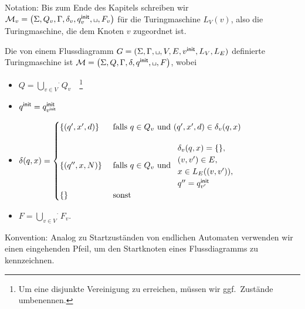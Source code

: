 Notation: Bis zum Ende des Kapitels schreiben wir
$\M_v=\left(\Sigma,Q_v,\Gamma,\delta_v,\qinit_v,\blank,F_v\right)$
für die Turingmaschine $L_V(v)$, also die Turingmaschine, die dem Knoten $v$ zugeordnet ist.

\begin{Def}%
Die von einem Flussdiagramm $G=(\Sigma, \Gamma, \blank,V,E,v^\mathsf{init},L_V,L_E)$ definierte Turingmaschine ist 
$\M=\left(\Sigma,Q,\Gamma,\delta,\qinit,\blank,F\right)$, wobei
\begin{itemize}
 \item $Q=\overset{.}{\bigcup\limits_{v\in V}} Q_v$~~\footnote{Um eine disjunkte Vereinigung zu erreichen, müssen wir ggf.\ Zustände umbenennen.}
 \item $q^\mathsf{init} = q^\mathsf{init}_{v^\mathsf{init}}$
 \item $\delta(q,x) = 
 \begin{cases}
 \{(q',x',d)\} & \text{ falls } q\in Q_v \text{ und } (q',x',d)\in\delta_v(q,x)\\[4mm]
 \{(q'',x,N)\} & \text{ falls } q\in Q_v \text{ und } 
      \begin{array}{l}
       \delta_v(q,x)=\{\},\\
       (v,v')\in E,\\
       x\in L_E((v,v')),\\
       q''=q^\mathsf{init}_{{v'}}
      \end{array}\\
 \{\} & \text{ sonst }\\
 \end{cases}$
 \item $F=\overset{.}{\bigcup\limits_{v\in V}} F_v$.
 \qedhere
\end{itemize}
\end{Def}

Konvention: Analog zu Startzuständen von endlichen Automaten verwenden wir einen eingehenden Pfeil, um den Startknoten eines Flussdiagramms zu kennzeichnen.

